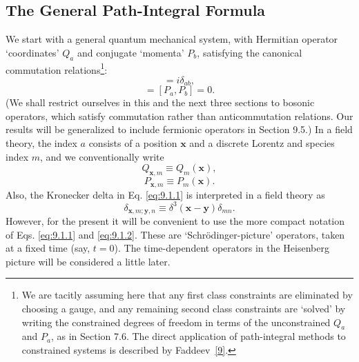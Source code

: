 \subsection{The General Path-Integral Formula}

We start with a general quantum mechanical system, with Hermitian operator
`coordinates' $Q_a$ and conjugate `momenta' $P_b$, satisfying the canonical
commutation relations\footnote{We are tacitly assuming here that any first
class constraints are eliminated by choosing a gauge, and any remaining
second class constraints are `solved' by writing the constrained degrees of
freedom in terms of the unconstrained $Q_a$ and $P_a$, as in Section 7.6.
The direct application of path-integral methods to constrained systems is
described by Faddeev~\hyperref[ref:9.9]{[9]}.}:
\begin{equation}
  [Q_a,P_b]=i\delta_{ab},
  \tag{9.1.1}\label{eq:9.1.1}
\end{equation}
\begin{equation}
  [Q_a,Q_b]=[P_a,P_b]=0.
  \tag{9.1.2}\label{eq:9.1.2}
\end{equation}
(We shall restrict ourselves in this and the next three sections to bosonic
operators, which satisfy commutation rather than anticommutation relations.
Our results will be generalized to include fermionic operators in Section 9.5.)
In a field theory, the index $a$ consists of a position $\mathbf{x}$ and a
discrete Lorentz and species index $m$, and we conventionally write
\begin{equation}
  Q_{\mathbf{x},m}\equiv Q_m(\mathbf{x}),
  \tag{9.1.3}\label{eq:9.1.3}
\end{equation}
\begin{equation}
  P_{\mathbf{x},m}\equiv P_m(\mathbf{x}).
  \tag{9.1.4}\label{eq:9.1.4}
\end{equation}
Also, the Kronecker delta in Eq. \eqref{eq:9.1.1} is interpreted in a field theory as
\begin{equation}
  \delta_{\mathbf{x},m;\mathbf{y},n}\equiv
  \delta^3(\mathbf{x}-\mathbf{y})\delta_{mn}.
  \tag{9.1.5}\label{eq:9.1.5}
\end{equation}
However, for the present it will be convenient to use the more compact
notation of Eqs. \eqref{eq:9.1.1} and \eqref{eq:9.1.2}. These are `Schr\"odinger-picture'
operators, taken at a fixed time (say, $t=0$). The time-dependent operators
in the Heisenberg picture will be considered a little later.

